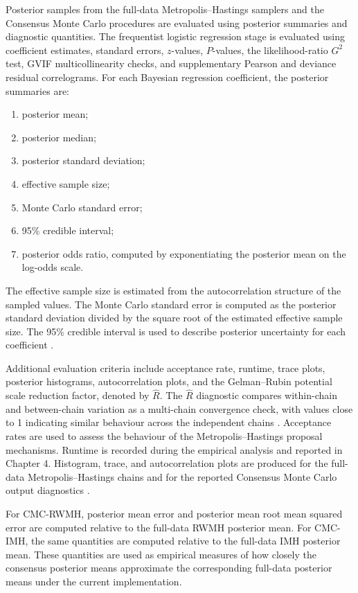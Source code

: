 Posterior samples from the full-data Metropolis--Hastings samplers and the Consensus Monte Carlo procedures are evaluated using posterior summaries and diagnostic quantities. The frequentist logistic regression stage is evaluated using coefficient estimates, standard errors, $z$-values, $P$-values, the likelihood-ratio $G^2$ test, GVIF multicollinearity checks, and supplementary Pearson and deviance residual correlograms. For each Bayesian regression coefficient, the posterior summaries are:
\begin{enumerate}
\item posterior mean;
\item posterior median;
\item posterior standard deviation;
\item effective sample size;
\item Monte Carlo standard error;
\item 95\% credible interval;
\item posterior odds ratio, computed by exponentiating the posterior mean on the log-odds scale.
\end{enumerate}

The effective sample size is estimated from the autocorrelation structure of the sampled values. The Monte Carlo standard error is computed as the posterior standard deviation divided by the square root of the estimated effective sample size. The 95\% credible interval is used to describe posterior uncertainty for each coefficient \cite{flegal2008mcmc}.

Additional evaluation criteria include acceptance rate, runtime, trace plots, posterior histograms, autocorrelation plots, and the Gelman--Rubin potential scale reduction factor, denoted by $\widehat{R}$. The $\widehat{R}$ diagnostic compares within-chain and between-chain variation as a multi-chain convergence check, with values close to 1 indicating similar behaviour across the independent chains \cite{gelman1992inference}. Acceptance rates are used to assess the behaviour of the Metropolis--Hastings proposal mechanisms. Runtime is recorded during the empirical analysis and reported in Chapter 4. Histogram, trace, and autocorrelation plots are produced for the full-data Metropolis--Hastings chains and for the reported Consensus Monte Carlo output diagnostics \cite{brooks1998general,cowles1996markov}.

For CMC-RWMH, posterior mean error and posterior mean root mean squared error are computed relative to the full-data RWMH posterior mean. For CMC-IMH, the same quantities are computed relative to the full-data IMH posterior mean. These quantities are used as empirical measures of how closely the consensus posterior means approximate the corresponding full-data posterior means under the current implementation.
